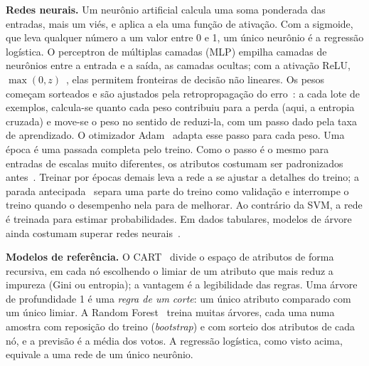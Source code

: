 \textbf{Redes neurais.} Um neurônio artificial calcula uma soma ponderada das entradas, mais um viés, e aplica a ela uma função de ativação. Com a sigmoide, que leva qualquer número a um valor entre 0 e 1, um único neurônio é a regressão logística. O perceptron de múltiplas camadas (MLP) empilha camadas de neurônios entre a entrada e a saída, as camadas ocultas; com a ativação ReLU, $\max(0, z)$~\cite{nair:10}, elas permitem fronteiras de decisão não lineares. Os pesos começam sorteados e são ajustados pela retropropagação do erro~\cite{rumelhart:86}: a cada lote de exemplos, calcula-se quanto cada peso contribuiu para a perda (aqui, a entropia cruzada) e move-se o peso no sentido de reduzi-la, com um passo dado pela taxa de aprendizado. O otimizador Adam~\cite{kingma:15} adapta esse passo para cada peso. Uma época é uma passada completa pelo treino. Como o passo é o mesmo para entradas de escalas muito diferentes, os atributos costumam ser padronizados antes~\cite{lecun:98}. Treinar por épocas demais leva a rede a se ajustar a detalhes do treino; a parada antecipada~\cite{prechelt:98} separa uma parte do treino como validação e interrompe o treino quando o desempenho nela para de melhorar. Ao contrário da SVM, a rede é treinada para estimar probabilidades. Em dados tabulares, modelos de árvore ainda costumam superar redes neurais~\cite{grinsztajn:22}.

\textbf{Modelos de referência.} O CART~\cite{breiman:84} divide o espaço de atributos de forma recursiva, em cada nó escolhendo o limiar de um atributo que mais reduz a impureza (Gini ou entropia); a vantagem é a legibilidade das regras. Uma árvore de profundidade 1 é uma \emph{regra de um corte}: um único atributo comparado com um único limiar. A Random Forest~\cite{breiman:01} treina muitas árvores, cada uma numa amostra com reposição do treino (\emph{bootstrap}) e com sorteio dos atributos de cada nó, e a previsão é a média dos votos. A regressão logística, como visto acima, equivale a uma rede de um único neurônio.
